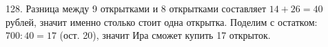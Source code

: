 128. Разница между 9 открытками и 8 открытками составляет $14+26=40$ рублей, значит именно столько стоит одна открытка. Поделим с остатком: $700:40=17$ (ост. 20), значит Ира сможет купить 17 открыток.\\
